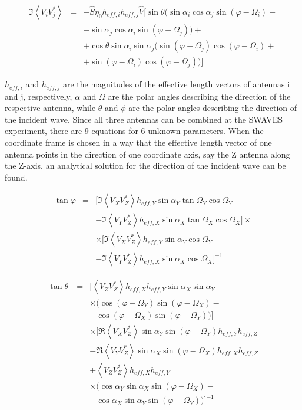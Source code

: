 \documentclass[galley,ras]{agu2001}
\begin{document}
\begin{article}
\begin{eqnarray}
\Im \left\langle V_i V_j^{*}\right\rangle &=& - \hat{S}\eta_0 h_{eff,i} h_{eff,j} \hat{V}[ \sin \theta(\sin \alpha_i \cos \alpha_j \sin (\varphi - \Omega_i) - \nonumber\\
& & - \sin \alpha_j \cos \alpha_i \sin (\varphi - \Omega_j))+ \nonumber \\
& & +\cos \theta \sin \alpha_i \sin \alpha_j(\sin (\varphi - \Omega_j) \cos (\varphi - \Omega_i)+ \nonumber \\
& & + \sin (\varphi - \Omega_i) \cos (\varphi - \Omega_j) ) ]
\end{eqnarray}

$h_{eff,i}$ and  $h_{eff,j}$ are the magnitudes of the effective length vectors of antennas i and j, respectively, $\alpha$ and $\Omega$ are the polar angles describing the direction of the respective antenna, while $\theta$ and $\phi$ are the polar angles describing the direction of the incident wave. Since all three antennas can be combined at the SWAVES experiment, there are 9 equations for 6 unknown parameters. When the coordinate frame is chosen in a way that the effective length vector of one antenna points in the direction of one coordinate axis, say the Z antenna along the Z-axis, an analytical solution for the direction of the incident wave can be found.


\begin{eqnarray}\label{tan_phi}
\tan \varphi &=& [\Im \left\langle V_X V_Z^{*}\right\rangle h_{eff,Y} \sin \alpha_Y \tan \Omega_Y \cos \Omega_Y-\nonumber\\
& & -\Im \left\langle V_Y V_Z^{*}\right\rangle h_{eff,X} \sin \alpha_X \tan \Omega_X \cos \Omega_X] \times \nonumber \\ & &\times[\Im \left\langle V_X V_Z^{*}\right\rangle h_{eff,Y} \sin \alpha_Y \cos \Omega_Y -\nonumber \\
& &  -\Im \left\langle V_Y V_Z^{*}\right\rangle h_{eff,X} \sin \alpha_X  \cos \Omega_X]^{-1}
\end{eqnarray}


\begin{eqnarray}\label{tan_theta}
\tan \theta\  &=& [\left\langle V_Z V_Z^{*} \right\rangle h_{eff,X} h_{eff,Y} \sin \alpha_X  \sin \alpha_Y \nonumber \\
&&\times ( \cos (\varphi - \Omega_Y)  \sin (\varphi - \Omega_X) -\nonumber \\
&&-\cos (\varphi - \Omega_X)  \sin (\varphi - \Omega_Y))]\nonumber \\
&& \times [\Re \left\langle V_X V_Z^{*}\right\rangle \sin \alpha_Y  \sin (\varphi - \Omega_Y) h_{eff,Y}h_{eff,Z} \nonumber \\
&&-\Re \left\langle V_Y V_Z^{*}\right\rangle\sin \alpha_X  \sin (\varphi - \Omega_X) h_{eff,X}h_{eff,Z}\nonumber \\ &&+\left\langle V_Z V_Z^{*} \right\rangle h_{eff,X} h_{eff,Y} \nonumber \\
&&\times(\cos \alpha_Y \sin \alpha_X  \sin (\varphi - \Omega_X)-\nonumber \\
&& -\cos \alpha_X  \sin \alpha_Y  \sin (\varphi - \Omega_Y))]^{-1}
\end{eqnarray}


\end{article}
\end{document}
